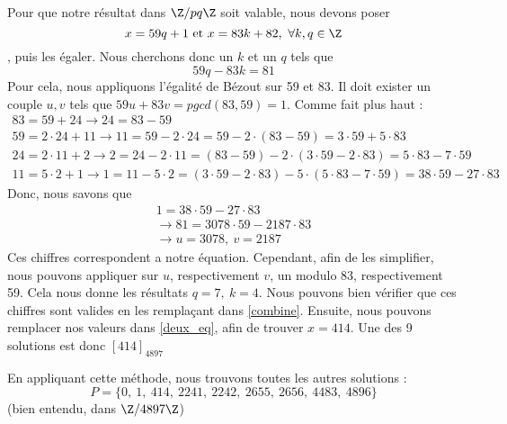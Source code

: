 \documentclass[10p,a4paper]{scrartcl}
\begin{document}
\begin{enumerate}
			Pour que notre résultat dans $\Z/pq\Z$ soit valable, nous devons poser 
			\begin{equation}
				x = 59 q + 1\text{ et }x = 83k + 82,\ \forall k,q \in \Z
				\label{deux_eq}
			\end{equation}, puis les égaler. Nous cherchons donc un $k$ et un $q$ tels que 
			\begin{equation}
				59q - 83k = 81
				\label{combine}
			\end{equation}
			Pour cela, nous appliquons l'égalité de Bézout sur 59 et 83. Il doit exister un couple $u,v$ tels que $59u + 83 v = pgcd(83,59) = 1$. Comme fait plus haut :
			\begin{align*}
				83 = 59 + 24 \to 24 = 83 - 59\\
				59 = 2\cdot 24 + 11 \to 11 = 59 - 2\cdot 24 = 59-2\cdot(83-59) = 3\cdot 59 + 5\cdot 83\\
				24 = 2\cdot 11 + 2 \to 2 = 24 - 2\cdot 11 = (83-59) - 2\cdot (3\cdot 59 -2\cdot 83) = 5\cdot 83 - 7\cdot 59\\
				11 = 5\cdot 2 + 1 \to 1 = 11 - 5\cdot 2 = (3\cdot 59-2\cdot 83) - 5\cdot (5\cdot 83-7\cdot 59) = 38\cdot 59 - 27\cdot 83
			\end{align*}
			Donc, nous savons que
			\begin{align*}
			1 = 38\cdot 59 - 27\cdot 83\\
			\to 81 = 3078 \cdot 59 - 2187 \cdot 83\\
			\to u = 3078,\ v = 2187
			\end{align*}
			Ces chiffres correspondent a notre équation. Cependant, afin de les simplifier, nous pouvons appliquer sur $u$, respectivement $v$, un modulo 83, respectivement 59. Cela nous donne les résultats $q = 7,\ k = 4$. Nous pouvons bien vérifier que ces chiffres sont valides en les remplaçant dans \eqref{combine}. Ensuite, nous pouvons remplacer nos valeurs dans \eqref{deux_eq}, afin de trouver $x = 414$. Une des 9 solutions est donc $[414]_{4897}$
			
			En appliquant cette méthode, nous trouvons toutes les autres solutions : 
			\begin{equation*}
			P = \{0,\ 1,\ 414,\ 2241,\ 2242,\ 2655,\ 2656,\ 4483,\ 4896\}
			\end{equation*}
			(bien entendu, dans $\Z/4897\Z$)
			

\end{enumerate}
\end{document}
